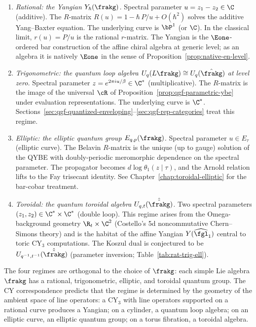 \begin{definition}
\label{def:qgf-four-regimes}
\begin{enumerate}[label=\textup{(\roman*)}]
 \item \emph{Rational: the Yangian $Y_\hbar(\frakg)$.} Spectral parameter $u = z_1 - z_2 \in \C$ (additive). The $R$-matrix $R(u) = 1 - \hbar\,P/u + O(\hbar^2)$ solves the additive Yang--Baxter equation. The underlying curve is $\bP^1$ (or $\C$). In the classical limit, $r(u) = P/u$ is the rational $r$-matrix. The Yangian is the $\Eone$-ordered bar construction of the affine chiral algebra at generic level; as an algebra it is natively $\Eone$ in the sense of Proposition~\ref{prop:native-en-level}.

 \item \emph{Trigonometric: the quantum loop algebra $U_q(L\frakg) \cong U_q(\hat{\frakg})$ at level zero.} Spectral parameter $z = e^{2\pi i u / \beta} \in \C^*$ (multiplicative). The $R$-matrix is the image of the universal $\cR$ of Proposition~\ref{prop:qgf-parametric-ybe} under evaluation representations. The underlying curve is $\C^*$. Sections~\ref{sec:qgf-quantized-enveloping}--\ref{sec:qgf-rep-categories} treat this regime.

 \item \emph{Elliptic: the elliptic quantum group $E_{q,p}(\frakg)$.} Spectral parameter $u \in E_\tau$ (elliptic curve). The Belavin $R$-matrix is the unique (up to gauge) solution of the QYBE with doubly-periodic meromorphic dependence on the spectral parameter. The propagator becomes $d\!\log\theta_1(z \mid \tau)$, and the Arnold relation lifts to the Fay trisecant identity. See Chapter~\ref{chap:toroidal-elliptic} for the bar-cobar treatment.

 \item \emph{Toroidal: the quantum toroidal algebra $U_{q,t}(\hat{\hat{\frakg}})$.} Two spectral parameters $(z_1, z_2) \in \C^* \times \C^*$ (double loop). This regime arises from the Omega-background geometry $\R_t \times \C^2$ (Costello's 5d noncommutative Chern--Simons theory) and is the habitat of the affine Yangian $Y(\widehat{\fgl}_1)$ central to toric CY$_3$ computations. The Koszul dual is conjectured to be $U_{q^{-1}, t^{-1}}(\hat{\hat{\frakg}})$ (parameter inversion; Table~\ref{tab:rat-trig-ell}).
\end{enumerate}
\end{definition}

\begin{remark}
\label{rem:qgf-regime-vs-type}
The four regimes are orthogonal to the choice of $\frakg$: each simple Lie algebra $\frakg$ has a rational, trigonometric, elliptic, and toroidal quantum group. The CY correspondence predicts that the regime is determined by the geometry of the ambient space of line operators: a CY$_3$ with line operators supported on a rational curve produces a Yangian; on a cylinder, a quantum loop algebra; on an elliptic curve, an elliptic quantum group; on a torus fibration, a toroidal algebra.
\end{remark}

